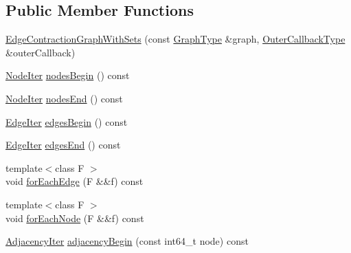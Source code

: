 \subsection*{Public Member Functions}
\begin{DoxyCompactItemize}
\item 
\hyperlink{classnifty_1_1graph_1_1EdgeContractionGraphWithSets_a7ccb1db6a954ebcd7d4e56b150812ca2}{Edge\+Contraction\+Graph\+With\+Sets} (const \hyperlink{classnifty_1_1graph_1_1EdgeContractionGraphWithSets_abadbbebcd10e37a1a3f59bb967accdf0}{Graph\+Type} \&graph, \hyperlink{classnifty_1_1graph_1_1EdgeContractionGraphWithSets_a2f741cfabfa1fb4c5bfc75df557c1d12}{Outer\+Callback\+Type} \&outer\+Callback)
\item 
\hyperlink{classnifty_1_1graph_1_1EdgeContractionGraphWithSets_af9e889455b883d034bf708a0b5b05bee}{Node\+Iter} \hyperlink{classnifty_1_1graph_1_1EdgeContractionGraphWithSets_ac092ab91cc82d5d75f19cca3770c33a5}{nodes\+Begin} () const
\item 
\hyperlink{classnifty_1_1graph_1_1EdgeContractionGraphWithSets_af9e889455b883d034bf708a0b5b05bee}{Node\+Iter} \hyperlink{classnifty_1_1graph_1_1EdgeContractionGraphWithSets_ae6b55d6c45a760b7e85e98fcbe89b5fa}{nodes\+End} () const
\item 
\hyperlink{classnifty_1_1graph_1_1EdgeContractionGraphWithSets_abfc56b6e721306de50e308e7b199b18c}{Edge\+Iter} \hyperlink{classnifty_1_1graph_1_1EdgeContractionGraphWithSets_acb3a7779de4afce4977b4cd9f2a91ccc}{edges\+Begin} () const
\item 
\hyperlink{classnifty_1_1graph_1_1EdgeContractionGraphWithSets_abfc56b6e721306de50e308e7b199b18c}{Edge\+Iter} \hyperlink{classnifty_1_1graph_1_1EdgeContractionGraphWithSets_aca281d65d5cf3d75727cf9f21745bad6}{edges\+End} () const
\item 
{\footnotesize template$<$class F $>$ }\\void \hyperlink{classnifty_1_1graph_1_1EdgeContractionGraphWithSets_ad92d1f5c35f5bb71c1c0530f7f1cfe30}{for\+Each\+Edge} (F \&\&f) const
\item 
{\footnotesize template$<$class F $>$ }\\void \hyperlink{classnifty_1_1graph_1_1EdgeContractionGraphWithSets_a87a64d238e0316537b86bef06f522c2f}{for\+Each\+Node} (F \&\&f) const
\item 
\hyperlink{classnifty_1_1graph_1_1EdgeContractionGraphWithSets_ab4782e97223ab8ba2d207325aae693d6}{Adjacency\+Iter} \hyperlink{classnifty_1_1graph_1_1EdgeContractionGraphWithSets_afa35da06be055f5b3b5ca45140c2a27d}{adjacency\+Begin} (const int64\+\_\+t node) const

\end{DoxyCompactItemize}
